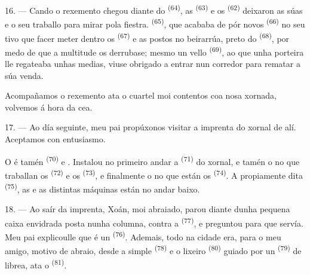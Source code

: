16. --- Cando o rexemento chegou diante do 
\textsuperscript{(64)}, as  \textsuperscript{(63)} e os
 \textsuperscript{(62)} deixaron as súas  e
o seu traballo para mirar pola fiestra. 
\textsuperscript{(65)}, que acababa de pór  novos
\textsuperscript{(66)} no seu  tivo que facer meter dentro os
 \textsuperscript{(67)} e as  postos no beirarrúa, preto do
 \textsuperscript{(68)}, por medo de que a multitude os derrubase;
mesmo un vello  \textsuperscript{(69)}, ao que unha
porteira lle regateaba unhas medias, viuse obrigado a entrar nun corredor para rematar
a súa venda.

Acompañamos o rexemento ata o cuartel  moi contentos coa nosa xornada,
volvemos á hora da cea.

\VUsaut{3.0mm}

17. --- Ao día seguinte, meu pai propúxonos visitar a imprenta do xornal de alí.
Aceptamos con entusiasmo.

O  é tamén  \textsuperscript{(70)}    e .
Instalou no primeiro andar a  \textsuperscript{(71)} do xornal, e
tamén o  no que traballan os 
\textsuperscript{(72)} e os  \textsuperscript{(73)}, e
finalmente o  no que están os  \textsuperscript{(74)}. A  propiamente dita
\textsuperscript{(75)}, as  e as distintas máquinas están
no andar baixo.

\VUsaut{3.0mm}

18. --- Ao saír da imprenta, Xoán, moi abraiado, parou diante dunha pequena caixa
envidrada posta nunha columna, contra a  \textsuperscript{(77)}, e
preguntou para que servía. Meu pai explicoulle que é un  \textsuperscript{(76)}. Ademais, todo na cidade era, para o meu amigo,
motivo de abraio, desde a simple  \textsuperscript{(78)} e o
lixeiro  \textsuperscript{(80)} guiado por un
 \textsuperscript{(79)} de librea, ata o 
\textsuperscript{(81)}.

